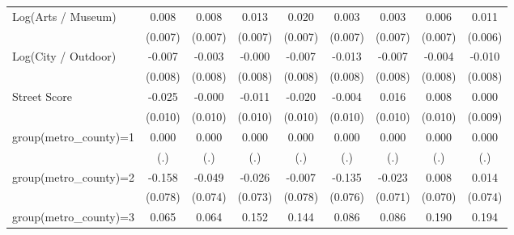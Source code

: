 {\begin{tabular}{l*{8}{c}}
Log(Arts / Museum)  &       0.008         &       0.008         &       0.013\sym{*}  &       0.020\sym{***}&       0.003         &       0.003         &       0.006         &       0.011\sym{*}  \\
                    &     (0.007)         &     (0.007)         &     (0.007)         &     (0.007)         &     (0.007)         &     (0.007)         &     (0.007)         &     (0.006)         \\
Log(City / Outdoor) &      -0.007         &      -0.003         &      -0.000         &      -0.007         &      -0.013\sym{*}  &      -0.007         &      -0.004         &      -0.010         \\
                    &     (0.008)         &     (0.008)         &     (0.008)         &     (0.008)         &     (0.008)         &     (0.008)         &     (0.008)         &     (0.008)         \\
Street Score        &      -0.025\sym{**} &      -0.000         &      -0.011         &      -0.020\sym{**} &      -0.004         &       0.016         &       0.008         &       0.000         \\
                    &     (0.010)         &     (0.010)         &     (0.010)         &     (0.010)         &     (0.010)         &     (0.010)         &     (0.010)         &     (0.009)         \\
group(metro\_county)=1&       0.000         &       0.000         &       0.000         &       0.000         &       0.000         &       0.000         &       0.000         &       0.000         \\
                    &         (.)         &         (.)         &         (.)         &         (.)         &         (.)         &         (.)         &         (.)         &         (.)         \\
group(metro\_county)=2&      -0.158\sym{**} &      -0.049         &      -0.026         &      -0.007         &      -0.135\sym{*}  &      -0.023         &       0.008         &       0.014         \\
                    &     (0.078)         &     (0.074)         &     (0.073)         &     (0.078)         &     (0.076)         &     (0.071)         &     (0.070)         &     (0.074)         \\
group(metro\_county)=3&       0.065         &       0.064         &       0.152         &       0.144         &       0.086         &       0.086         &       0.190\sym{*}  &       0.194\sym{**} \\

\end{tabular}}
